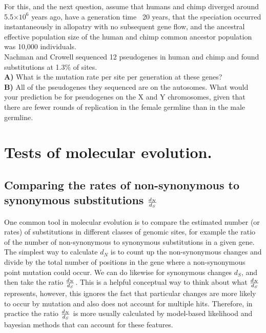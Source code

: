 



\begin{question}
For this, and the next question, assume that humans and chimp diverged
around 5.5$\times 10^6$ years ago, have a generation time ~20 years, that the speciation occurred instantaneously in allopatry with no subsequent gene flow, and the ancestral effective population size of the human and chimp common ancestor population was 10,000 individuals.\\
Nachman and Crowell sequenced 12 pseudogenes in human and chimp and found substitutions at 1.3\% of sites. \\
{\bf A) } What is the mutation rate per site per generation at these genes?\\
{\bf B)} All of the pseudogenes they sequenced are on the autosomes. What
would your prediction be for pseudogenes on the X and Y chromosomes,
given that there are fewer rounds of replication in the female
germline than in the male germline.
\end{question}

\section{Tests of molecular evolution.}

\subsection{Comparing the rates of non-synonymous to synonymous
substitutions $\frac{d_N}{d_S}$}
One common tool in molecular evolution is to compare the estimated number (or rates) of substitutions in different classes of genomic sites, for example the ratio of the number of non-synonymous to synonymous substitutions in a given gene. The simplest way to calculate $d_N$ is to 
count up the non-synonymous changes and divide by the total number of
positions in the gene where a non-synonymous point mutation could occur. We
can do likewise for synonymous changes $d_S$, and then take the ratio $\frac{d_N}{d_S}$. This is a helpful
conceptual way to think about what $\frac{d_N}{d_S}$ represents, however, this
ignores the fact that particular changes are more likely to occur by
mutation and also does not account for multiple hits. Therefore, in
practice the ratio $\frac{d_N}{d_S}$ is more usually calculated by model-based
likelihood and bayesian methods
that can account for these features. 

